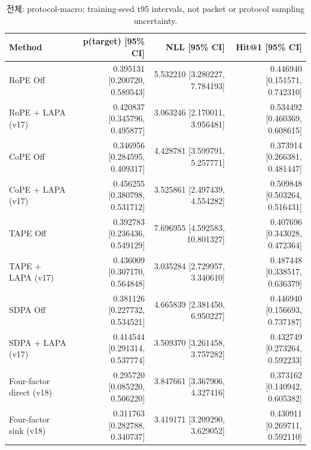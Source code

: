 \begin{table}[t]
\centering
\scriptsize
\caption{전체: protocol-macro; training-seed t95 intervals, not packet or protocol sampling uncertainty.}
\begin{tabular}{lrrr}
\toprule
Method & p(target) [95\% CI] & NLL [95\% CI] & Hit@1 [95\% CI] \\
\midrule
RoPE Off & 0.395131 [0.200720, 0.589543] & 5.532210 [3.280227, 7.784193] & 0.446940 [0.151571, 0.742310] \\
RoPE + LAPA (v17) & 0.420837 [0.345796, 0.495877] & 3.063246 [2.170011, 3.956481] & 0.534492 [0.460369, 0.608615] \\
CoPE Off & 0.346956 [0.284595, 0.409317] & 4.428781 [3.599791, 5.257771] & 0.373914 [0.266381, 0.481447] \\
CoPE + LAPA (v17) & 0.456255 [0.380798, 0.531712] & 3.525861 [2.497439, 4.554282] & 0.509848 [0.503264, 0.516431] \\
TAPE Off & 0.392783 [0.236436, 0.549129] & 7.696955 [4.592583, 10.801327] & 0.407696 [0.343028, 0.472364] \\
TAPE + LAPA (v17) & 0.436009 [0.307170, 0.564848] & 3.035284 [2.729957, 3.340610] & 0.487448 [0.338517, 0.636379] \\
SDPA Off & 0.381126 [0.227732, 0.534521] & 4.665839 [2.381450, 6.950227] & 0.446940 [0.156693, 0.737187] \\
SDPA + LAPA (v17) & 0.414544 [0.291314, 0.537774] & 3.509370 [3.261458, 3.757282] & 0.432749 [0.273264, 0.592233] \\
Four-factor direct (v18) & 0.295720 [0.085220, 0.506220] & 3.847661 [3.367906, 4.327416] & 0.373162 [0.140942, 0.605382] \\
Four-factor sink (v18) & 0.311763 [0.282788, 0.340737] & 3.419171 [3.209290, 3.629052] & 0.430911 [0.269711, 0.592110] \\
\bottomrule
\end{tabular}
\end{table}
